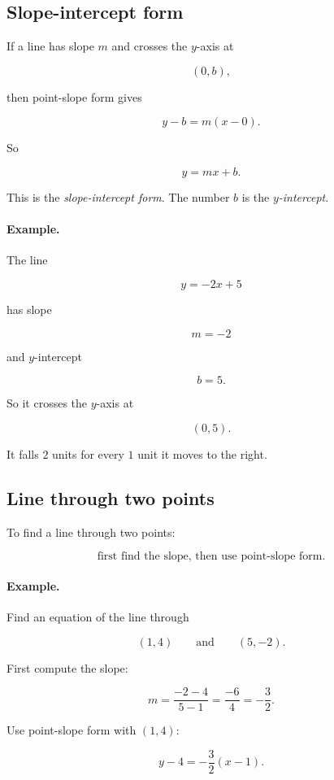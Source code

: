 \subsection{Slope-intercept form}
\label{appsubsec:slope-intercept-form}

If a line has slope \(m\) and crosses the \(y\)-axis at

\[
(0,b),
\]

then point-slope form gives

\[
y-b=m(x-0).
\]

So

\[
\boxed{
y=mx+b.
}
\]

This is the \emph{slope-intercept form}.  The number \(b\) is the
\emph{\(y\)-intercept}.

\paragraph{Example.}
The line

\[
y=-2x+5
\]

has slope

\[
m=-2
\]

and \(y\)-intercept

\[
b=5.
\]

So it crosses the \(y\)-axis at

\[
(0,5).
\]

It falls \(2\) units for every \(1\) unit it moves to the right.

\subsection{Line through two points}
\label{appsubsec:line-through-two-points}

To find a line through two points:

\[
\text{first find the slope, then use point-slope form.}
\]

\paragraph{Example.}
Find an equation of the line through

\[
(1,4)
\qquad\text{and}\qquad
(5,-2).
\]

First compute the slope:

\[
m=\frac{-2-4}{5-1}=\frac{-6}{4}=-\frac32.
\]

Use point-slope form with \((1,4)\):

\[
y-4=-\frac32(x-1).
\]

